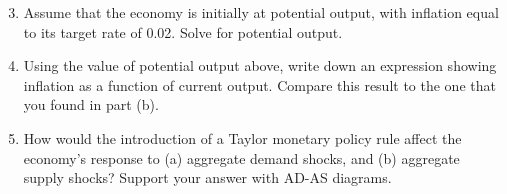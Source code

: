 \documentclass{article}
\begin{document}
\begin{enumerate}
	\begin{enumerate}
	
	\setcounter{enumii}{2}
	\item Assume that the economy is initially at potential output, with inflation equal to its target rate of 0.02. Solve for potential output.
	
	\item Using the value of potential output above, write down an expression showing inflation as a function of current output. Compare this result to the one that you found in part (b).
	
	\item How would the introduction of a Taylor monetary policy rule affect the economy's response to (a) aggregate demand shocks, and (b) aggregate supply shocks? Support your answer with AD-AS diagrams.
	
	\end{enumerate}

\end{enumerate}
\end{document}
